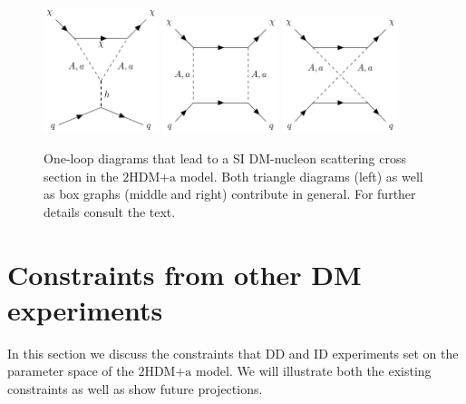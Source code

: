 \documentclass[a4paper, 11pt,notoc]{article}
\newcommand{\hdma}{\ensuremath{\textrm{2HDM+a}}\xspace}
\begin{document}

\begin{figure}[t!]
    \centering
    \includegraphics[width=0.3\textwidth]{pseudoTriangle.pdf} \quad 
    \includegraphics[width=0.3\textwidth]{pseudoBox.pdf} \quad 
    \includegraphics[width=0.3\textwidth]{pseudoBox2.pdf} 
    \vspace{4mm}
    \caption{One-loop diagrams that lead to a SI DM-nucleon scattering cross section in the \hdma model.  Both triangle diagrams (left) as well as box graphs (middle and right) contribute in general. For further details consult the text. }
    \label{fig:feynDDPS}
\end{figure}

\section{Constraints from other DM experiments}
\label{sec:DMdetection}

In this section we  discuss the constraints that DD and ID experiments set on the parameter space of the \hdma model. We will illustrate both the existing constraints as well as show future projections. 
\end{document}
